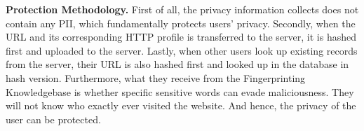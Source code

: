 \noindent
\textbf{Protection Methodology.}
First of all, the privacy information \spartacus collects does not contain any PII, which fundamentally protects users' privacy.
Secondly, when the URL and its corresponding HTTP profile is transferred to the server,
it is hashed first and uploaded to the server.
Lastly, when other users look up existing records from the server,
their URL is also hashed first and looked up in the database in hash version.
Furthermore, what they receive from the Fingerprinting Knowledgebase is whether specific sensitive words can evade maliciousness.
They will not know who exactly ever visited the website.
And hence, the privacy of the user can be protected.